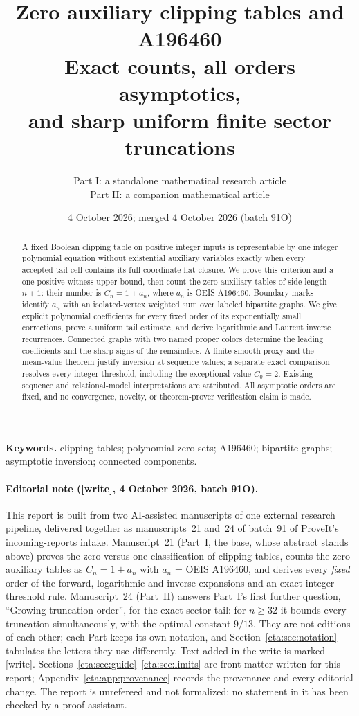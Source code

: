 \documentclass[11pt]{article}
\title{\bfseries Zero auxiliary clipping tables and A196460\\[3pt]
\Large Exact counts, all orders asymptotics,\\ and sharp uniform finite sector truncations}
\author{Part I: a standalone mathematical research article\\
Part II: a companion mathematical article}
\date{4 October 2026; merged 4 October 2026 (batch 91O)}
\theoremstyle{definition}
\theoremstyle{remark}
\newcommand{\wtag}{\textup{[write]}}
\begin{document}
\maketitle
\thispagestyle{empty}
\begin{abstract}
A fixed Boolean clipping table on positive integer inputs is representable by
one integer polynomial equation without existential auxiliary variables exactly
when every accepted tail cell contains its full coordinate-flat closure.
We prove this criterion and a one-positive-witness upper bound, then count the
zero-auxiliary tables of side length $n+1$: their number is $C_n=1+a_n$, where
$a_n$ is OEIS A196460. Boundary marks identify $a_n$ with an isolated-vertex
weighted sum over labeled bipartite graphs. We give explicit polynomial
coefficients for every fixed order of its exponentially small corrections,
prove a uniform tail estimate, and derive logarithmic and Laurent inverse
recurrences. Connected graphs with two named proper colors determine the
leading coefficients and the sharp signs of the remainders. A finite smooth
proxy and the mean-value theorem justify inversion at sequence values;
a separate exact comparison resolves every integer threshold, including the
exceptional value $C_0=2$. Existing sequence and relational-model interpretations
are attributed. All asymptotic orders are fixed, and no convergence, novelty,
or theorem-prover verification claim is made.
\end{abstract}
\vspace{4pt}
\noindent\textbf{Keywords.} clipping tables; polynomial zero sets; A196460;
bipartite graphs; asymptotic inversion; connected components.

\paragraph{Editorial note (\wtag, 4 October 2026, batch 91O).}
This report is built from two AI-assisted manuscripts of one external
research pipeline, delivered together as manuscripts~21 and~24 of
batch~91 of ProveIt's incoming-reports intake. Manuscript~21 (Part~I,
the base, whose abstract stands above) proves the zero-versus-one
classification of clipping tables, counts the zero-auxiliary tables as
$C_n=1+a_n$ with $a_n$ = OEIS A196460, and derives every \emph{fixed}
order of the forward, logarithmic and inverse expansions and an exact
integer threshold rule. Manuscript~24 (Part~II) answers Part~I's first
further question, ``Growing truncation order'', for the exact sector
tail: for $n\geq32$ it bounds every truncation simultaneously, with the
optimal constant $9/13$. They are not editions of each other; each Part
keeps its own notation, and Section~\ref{cta:sec:notation} tabulates the
letters they use differently. Text added in the write is marked
\wtag. Sections~\ref{cta:sec:guide}--\ref{cta:sec:limits} are front
matter written for this report; Appendix~\ref{cta:app:provenance}
records the provenance and every editorial change. The report is
unrefereed and not formalized; no statement in it has been checked by a
proof assistant.
\end{document}
